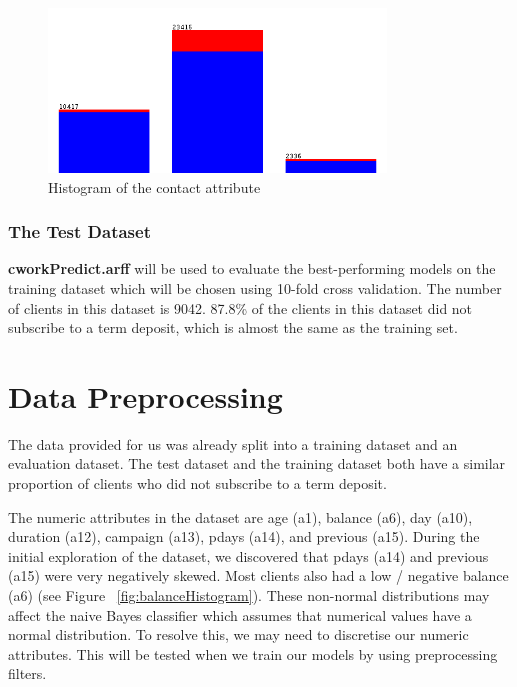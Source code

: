 \documentclass[a4paper,11pt]{article}
\begin{document}
\begin{figure}[H]
  \centering
  \includegraphics[width=0.8\textwidth]{pictures/contactHistogram.png}
  \caption{Histogram of the contact attribute}
  \label{fig:contactHistogram}
\end{figure}

\subsubsection{The Test Dataset}

\textbf{cworkPredict.arff} will be used to evaluate the best-performing models on the training dataset which will
be chosen using 10-fold cross validation. The number of clients in this dataset is 9042. 87.8\% of the clients
in this dataset did not subscribe to a term deposit, which is almost the same as the training set.

\section{Data Preprocessing}

The data provided for us was already split into a training dataset and an evaluation dataset. The test dataset
and the training dataset both have a similar proportion of clients who did not subscribe to a term deposit.

The numeric attributes in the dataset are age (a1), balance (a6), day (a10), duration (a12), campaign (a13), pdays (a14), 
and previous (a15). During the initial exploration of the dataset, we discovered that pdays (a14) and previous (a15) 
were very negatively skewed. Most clients also had a low / negative balance (a6) (see Figure ~\ref{fig:balanceHistogram}). 
These non-normal distributions may affect the naive Bayes classifier which assumes that numerical values have a normal 
distribution. To resolve this, we may need to discretise our numeric attributes. This will be tested when we train
our models by using preprocessing filters.
\end{document}

